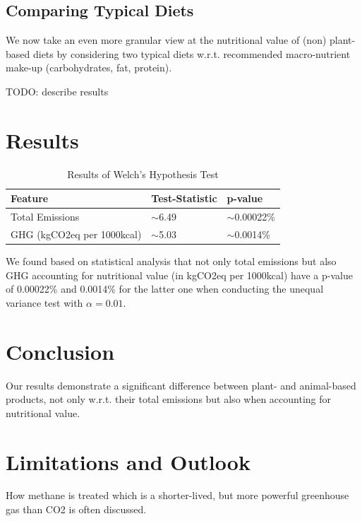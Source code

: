 \documentclass{article}
\begin{document}
\subsection{Comparing Typical Diets}
We now take an even more granular view at the nutritional value of (non) plant-based diets by considering two typical diets w.r.t. recommended macro-nutrient make-up (carbohydrates, fat, protein).

TODO: describe results
\section{Results}
\begin{table} \label{tbl:results}
  \caption{Results of  Welch's Hypothesis Test}
  \label{sample-table}
  \centering
  \begin{tabular}{lll}
    \toprule
    Feature     & Test-Statistic   & p-value  \\
    \midrule
    Total Emissions &$\sim$6.49  & $\sim$0.00022\%    \\
    GHG (kgCO2eq per 1000kcal)    & $\sim$5.03   & $\sim$0.0014\%   \\
    \bottomrule
  \end{tabular}
\end{table}

We found based on statistical analysis that not only total emissions but also GHG accounting for nutritional value (in kgCO2eq per 1000kcal) have a p-value of 0.00022\% and 0.0014\% for the latter one when conducting the unequal variance test with $\alpha = 0.01$.

\section{Conclusion}
\label{conclusion}
Our results demonstrate a significant difference between plant- and animal-based products, not only w.r.t. their total emissions but also when accounting for nutritional value. 

\section{Limitations and Outlook}
\label{limitations}
How methane is treated which is a shorter-lived, but more powerful greenhouse gas than CO2  is often discussed.
\end{document}
